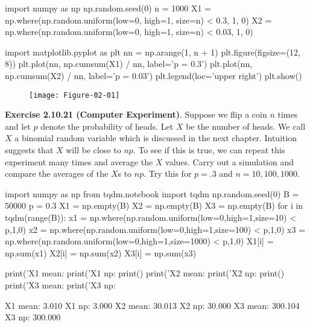 \begin{python}
import numpy as np
np.random.seed(0)
n = 1000
X1 = np.where(np.random.uniform(low=0, high=1, size=n) < 0.3, 1, 0) 
X2 = np.where(np.random.uniform(low=0, high=1, size=n) < 0.03, 1, 0) 
\end{python}

\begin{python}
import matplotlib.pyplot as plt
nn = np.arange(1, n + 1)
plt.figure(figsize=(12, 8))
plt.plot(nn, np.cumsum(X1) / nn, label='p = 0.3')
plt.plot(nn, np.cumsum(X2) / nn, label='p = 0.03')
plt.legend(loc='upper right')
plt.show()
\end{python}

\begin{figure}[H]
\centering
\texttt{[image: Figure-02-01]}
\end{figure}


\textbf{Exercise 2.10.21 (Computer Experiment)}. Suppose we flip a coin \(n\) times and let \(p\) denote the probability of heads. Let \(X\) be the number of heads. We call \(X\) a binomial random variable which is discussed in the next chapter. Intuition suggests that \(X\) will be close to \(np\). To see if this is true, we can repeat this experiment many times and average the \(X\) values. Carry out a simulation and compare the averages of the \(X\)s to \(np\). Try this for \(p = .3\) and \(n = 10, 100, 1000\).

\begin{python}
import numpy as np
from tqdm.notebook import tqdm
np.random.seed(0)
B = 50000
p = 0.3
X1 = np.empty(B)
X2 = np.empty(B)
X3 = np.empty(B)
for i in tqdm(range(B)):
    x1 = np.where(np.random.uniform(low=0,high=1,size=10) < p,1,0)
    x2 = np.where(np.random.uniform(low=0,high=1,size=100) < p,1,0)
    x3 = np.where(np.random.uniform(low=0,high=1,size=1000) < p,1,0)
    X1[i] = np.sum(x1)
    X2[i] = np.sum(x2)
    X3[i] = np.sum(x3)
\end{python}

\begin{python}
print('X1 mean: %
print('X1 np:   %
print()
print('X2 mean: %
print('X2 np:   %
print()
print('X3 mean: %
print('X3 np:   %
\end{python}
\begin{console}
X1 mean: 3.010
X1 np:   3.000
X2 mean: 30.013
X2 np:   30.000
X3 mean: 300.104
X3 np:   300.000
\end{console}

